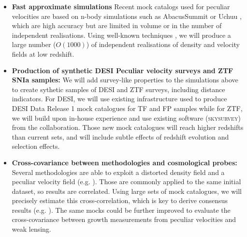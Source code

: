 \begin{itemize}
  \item \textbf{Fast approximate simulations}
    Recent mock catalogs used for peculiar velocities are based on n-body simulations 
    such as AbacusSummit \cite{DESIPV_Bautista}%
    or Uchuu \cite{ishiyamaUchuuSimulationsData2021}, 
    which are high accuracy but are limited in volume or in the number of independent realisations.
    Using well-known techniques \cite{chuangEZmocksExtendingZel2015,zhaoCompletedSDSSIVExtended2021},
    we will  
    produce a large number ($O(1000)$) of independent realisations of density and velocity fields at low redshift. 
  
  \item \textbf{Production of synthetic DESI Peculiar velocity surveys and ZTF SNIa samples:} 
    We will add survey-like properties to the simulations above to create sythetic samples of DESI and ZTF surveys,
    including distance indicators.  
    For DESI, we will use existing infrastructure used to produce DESI Data Release 1 mock catalogues for TF and FP samples 
    \cite{DESIPV_Bautista}
    while for ZTF, we will build upon in-house experience \cite{carreresGrowthrateMeasurementTypeIa2023} 
    and use existing software (\textsc{skysurvey}) from the collaboration.  
    Those new mock catalogues will reach higher redshifts than current sets, 
    and will include subtle effects of redshift evolution and selection effects. 

   

  \item \textbf{Cross-covariance between methodologies and cosmological probes:}
    Several methodologies are able to exploit a distorted 
    density field and a peculiar velocity field 
    (e.g.  \cite{ravouxGeneralizedFrameworkLikelihoodbased2025,qinRedshiftspaceMomentumPower2025}
    ). 
    Those are commonly applied to the same initial dataset, 
    so results are correlated. 
    Using large sets of mock catalogues, we will 
    precisely estimate this cross-correlation, which is key to derive consensus results 
    (e.g. \cite{sanchezClusteringGalaxiesCompleted2017,
    bautistaCompletedSDSSIVExtended2021,
    dumerchatBaryonAcousticOscillations2022}
    ).
    The same mocks could be further improved to evaluate the cross-covariance 
    between growth measurements from peculiar velocities and weak lensing.
\end{itemize}


